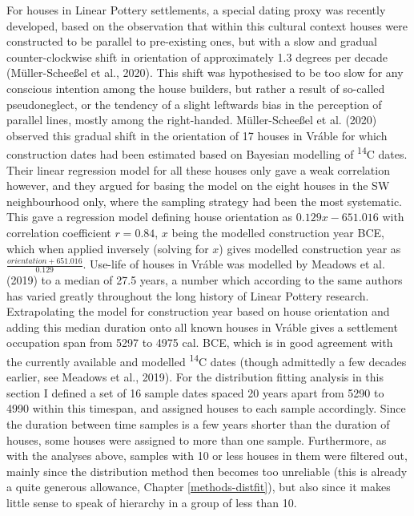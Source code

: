 \documentclass[
  12pt,
]{book}
\begin{document}
For houses in Linear Pottery settlements, a special dating proxy was recently developed, based on the observation that within this cultural context houses were constructed to be parallel to pre-existing ones, but with a slow and gradual counter-clockwise shift in orientation of approximately 1.3 degrees per decade (Müller-Scheeßel et al., 2020). This shift was hypothesised to be too slow for any conscious intention among the house builders, but rather a result of so-called pseudoneglect, or the tendency of a slight leftwards bias in the perception of parallel lines, mostly among the right-handed. Müller-Scheeßel et al. (2020) observed this gradual shift in the orientation of 17 houses in Vráble for which construction dates had been estimated based on Bayesian modelling of \textsuperscript{14}C dates. Their linear regression model for all these houses only gave a weak correlation however, and they argued for basing the model on the eight houses in the SW neighbourhood only, where the sampling strategy had been the most systematic. This gave a regression model defining house orientation as \(0.129x - 651.016\) with correlation coefficient \(r = 0.84\), \(x\) being the modelled construction year BCE, which when applied inversely (solving for \(x\)) gives modelled construction year as \(\frac{orientation + 651.016}{0.129}\). Use-life of houses in Vráble was modelled by Meadows et al. (2019) to a median of 27.5 years, a number which according to the same authors has varied greatly throughout the long history of Linear Pottery research. Extrapolating the model for construction year based on house orientation and adding this median duration onto all known houses in Vráble gives a settlement occupation span from 5297 to 4975 cal. BCE, which is in good agreement with the currently available and modelled \textsuperscript{14}C dates (though admittedly a few decades earlier, see Meadows et al., 2019). For the distribution fitting analysis in this section I defined a set of 16 sample dates spaced 20 years apart from 5290 to 4990 within this timespan, and assigned houses to each sample accordingly. Since the duration between time samples is a few years shorter than the duration of houses, some houses were assigned to more than one sample. Furthermore, as with the analyses above, samples with 10 or less houses in them were filtered out, mainly since the distribution method then becomes too unreliable (this is already a quite generous allowance, Chapter \ref{methods-distfit}), but also since it makes little sense to speak of hierarchy in a group of less than 10.
\end{document}
